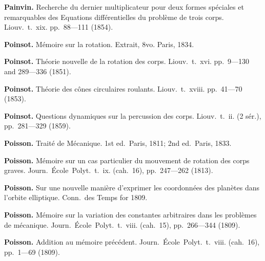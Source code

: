 \documentclass[11pt,a4paper]{book}
\begin{document}
\vspace{0.5em}

\noindent\textbf{Painvin.} Recherche du dernier multiplicateur pour deux formes sp\'{e}ciales et remarquables des Equations diff\'{e}rentielles du probl\`{e}me de trois corps. Liouv.~t.~xix. pp.~88---111 (1854).

\vspace{0.5em}

\noindent\textbf{Poinsot.} M\'{e}moire sur la rotation. Extrait, 8vo. Paris, 1834.

\vspace{0.5em}

\noindent\textbf{Poinsot.} Th\'{e}orie nouvelle de la rotation des corps. Liouv.~t.~xvi. pp.~9---130 and 289---336 (1851).

\vspace{0.5em}

\noindent\textbf{Poinsot.} Th\'{e}orie des c\^{o}nes circulaires roulants. Liouv.~t.~xviii. pp.~41---70 (1853).

\vspace{0.5em}

\noindent\textbf{Poinsot.} Questions dynamiques sur la percussion des corps. Liouv.~t.~ii. (2 s\'{e}r.), pp.~281---329 (1859).

\vspace{0.5em}

\noindent\textbf{Poisson.} Trait\'{e} de M\'{e}canique. 1st ed.~Paris, 1811; 2nd ed.~Paris, 1833.

\vspace{0.5em}

\noindent\textbf{Poisson.} M\'{e}moire sur un cas particulier du mouvement de rotation des corps graves. Journ.~\'{E}cole~Polyt.~t.~ix. (cah.~16), pp.~247---262 (1813).

\vspace{0.5em}

\noindent\textbf{Poisson.} Sur une nouvelle mani\`{e}re d'exprimer les coordonn\'{e}es des plan\`{e}tes dans l'orbite elliptique. Conn.~des Temps for 1809.

\vspace{0.5em}

\noindent\textbf{Poisson.} M\'{e}moire sur la variation des constantes arbitraires dans les probl\`{e}mes de m\'{e}canique. Journ.~\'{E}cole~Polyt.~t.~viii. (cah.~15), pp.~266---344 (1809).

\vspace{0.5em}

\noindent\textbf{Poisson.} Addition au m\'{e}moire pr\'{e}c\'{e}dent. Journ.~\'{E}cole~Polyt.~t.~viii. (cah.~16), pp.~1---69 (1809).
\end{document}
